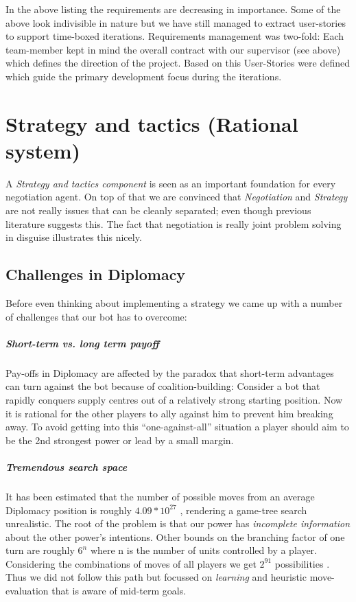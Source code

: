 \documentclass[pdftex,12pt,a4paper]{report}
\begin{document}
In the above listing the requirements are decreasing in
importance. Some of the above look indivisible in nature but we have
still managed to extract user-stories to support time-boxed
iterations. Requirements management was two-fold: Each
team-member kept in mind the overall contract with our supervisor (see
above) which defines the direction of the project.  Based on this
User-Stories were defined which guide the primary development focus
during the iterations.


\pagebreak

\chapter{Strategy and tactics (Rational system)}

A \textit{Strategy and tactics component} is seen as an important
foundation for every negotiation agent. On top of that we are 
convinced that \textit{Negotiation} and \textit{Strategy} are not
really issues that can be cleanly separated; even though previous
literature suggests this. The fact that negotiation is really
joint problem solving in disguise illustrates this nicely.

\section{Challenges in Diplomacy}

Before even thinking about implementing a strategy we came up with
a number of challenges that our bot has to overcome:

\paragraph{Short-term vs. long term payoff}
Pay-offs in Diplomacy are affected by the paradox that short-term
advantages can turn against the bot because of coalition-building:
Consider a bot that rapidly conquers supply centres out of a 
relatively strong starting position. Now it is rational for the
other players to ally against him to prevent him breaking away.
To avoid getting into this ``one-against-all'' situation a player
should aim to be the 2nd strongest power or lead by a small margin.

\paragraph{Tremendous search space}
It has been estimated that the number of possible moves from
an average Diplomacy position is roughly $4.09 * 10^{27}$ 
\cite{Kemmerling00}, rendering a game-tree search unrealistic. The root
of the problem is that our power has \textit{incomplete information} 
about the other power's intentions. Other bounds on the branching factor
of one turn are roughly $6^{n}$ where n is the number of units controlled by a
player. Considering the combinations of moves of all players we get
$2^{91}$ possibilities \cite{Shapiro02}. Thus we did not follow this
path but focussed on \textit{learning} and heuristic move-evaluation
that is aware of mid-term goals.
\end{document}

